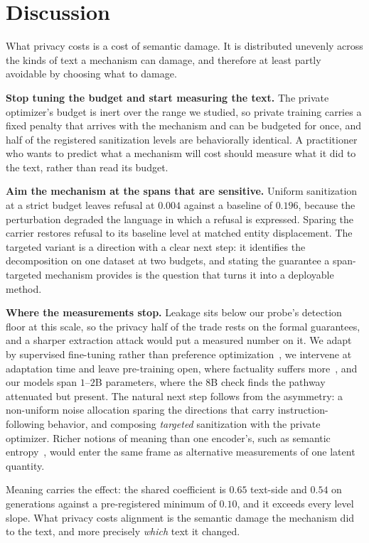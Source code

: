 \section{\label{sec:discussion}Discussion}
What privacy costs is a cost of semantic damage.
It is distributed unevenly across the kinds of text a mechanism can damage,
and therefore at least partly avoidable by choosing what to damage.

\textbf{Stop tuning the budget and start measuring the text.}
The private optimizer's budget is inert over the range we studied,
so private training carries a fixed penalty that arrives with the mechanism and can be budgeted for once,
and half of the registered sanitization levels are behaviorally identical.
A practitioner who wants to predict what a mechanism will cost should measure what it did to the text,
rather than read its budget.

\textbf{Aim the mechanism at the spans that are sensitive.}
Uniform sanitization at a strict budget leaves refusal at $0.004$ against a baseline of $0.196$,
because the perturbation degraded the language in which a refusal is expressed.
Sparing the carrier restores refusal to its baseline level at matched entity displacement.
The targeted variant is a direction with a clear next step:
it identifies the decomposition on one dataset at two budgets,
and stating the guarantee a span-targeted mechanism provides is the question that turns it into a deployable method.

\textbf{Where the measurements stop.}
Leakage sits below our probe's detection floor at this scale,
so the privacy half of the trade rests on the formal guarantees,
and a sharper extraction attack would put a measured number on it.
We adapt by supervised fine-tuning rather than preference optimization~\citep{ouyang2022training, rafailov2023direct},
we intervene at adaptation time and leave pre-training open,
where factuality suffers more~\citep{ramesh2026privacyhallucination},
and our models span $1$--$2$B parameters,
where the $8$B check finds the pathway attenuated but present.
The natural next step follows from the asymmetry:
a non-uniform noise allocation sparing the directions that carry instruction-following behavior,
and composing \textit{targeted} sanitization with the private optimizer.
Richer notions of meaning than one encoder's,
such as semantic entropy~\citep{farquhar2024detecting},
would enter the same frame as alternative measurements of one latent quantity.

Meaning carries the effect:
the shared coefficient is $0.65$ text-side and $0.54$ on generations against a pre-registered minimum of $0.10$,
and it exceeds every level slope.
What privacy costs alignment is the semantic damage the mechanism did to the text,
and more precisely \textit{which} text it changed.
